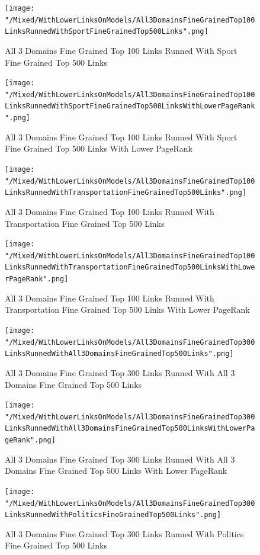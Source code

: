 \documentclass[thesis=M,english]{FITthesis}[2018/05/30]
\begin{document}
	\begin{figure}[H]\centering
		\texttt{[image: "/Mixed/WithLowerLinksOnModels/All3DomainsFineGrainedTop100LinksRunnedWithSportFineGrainedTop500Links".png]}
		\caption{All 3 Domains Fine Grained Top 100 Links Runned With Sport Fine Grained Top 500 Links}\label{}
	\end{figure}
	
	\begin{figure}[H]\centering
		\texttt{[image: "/Mixed/WithLowerLinksOnModels/All3DomainsFineGrainedTop100LinksRunnedWithSportFineGrainedTop500LinksWithLowerPageRank".png]}
		\caption{All 3 Domains Fine Grained Top 100 Links Runned With Sport Fine Grained Top 500 Links With Lower PageRank}\label{}
	\end{figure}
	
	\begin{figure}[H]\centering
		\texttt{[image: "/Mixed/WithLowerLinksOnModels/All3DomainsFineGrainedTop100LinksRunnedWithTransportationFineGrainedTop500Links".png]}
		\caption{All 3 Domains Fine Grained Top 100 Links Runned With Transportation Fine Grained Top 500 Links}\label{}
	\end{figure}

	\begin{figure}[H]\centering
		\texttt{[image: "/Mixed/WithLowerLinksOnModels/All3DomainsFineGrainedTop100LinksRunnedWithTransportationFineGrainedTop500LinksWithLowerPageRank".png]}
		\caption{All 3 Domains Fine Grained Top 100 Links Runned With Transportation Fine Grained Top 500 Links With Lower PageRank}\label{}
	\end{figure}
	
	\begin{figure}[H]\centering
		\texttt{[image: "/Mixed/WithLowerLinksOnModels/All3DomainsFineGrainedTop300LinksRunnedWithAll3DomainsFineGrainedTop500Links".png]}
		\caption{All 3 Domains Fine Grained Top 300 Links Runned With All 3 Domains Fine Grained Top 500 Links}\label{}
	\end{figure}
	
	\begin{figure}[H]\centering
		\texttt{[image: "/Mixed/WithLowerLinksOnModels/All3DomainsFineGrainedTop300LinksRunnedWithAll3DomainsFineGrainedTop500LinksWithLowerPageRank".png]}
		\caption{All 3 Domains Fine Grained Top 300 Links Runned With All 3 Domains Fine Grained Top 500 Links With Lower PageRank}\label{}
	\end{figure}
	
	\begin{figure}[H]\centering
		\texttt{[image: "/Mixed/WithLowerLinksOnModels/All3DomainsFineGrainedTop300LinksRunnedWithPoliticsFineGrainedTop500Links".png]}
		\caption{All 3 Domains Fine Grained Top 300 Links Runned With Politics Fine Grained Top 500 Links}\label{}
	\end{figure}
	
\end{document}
